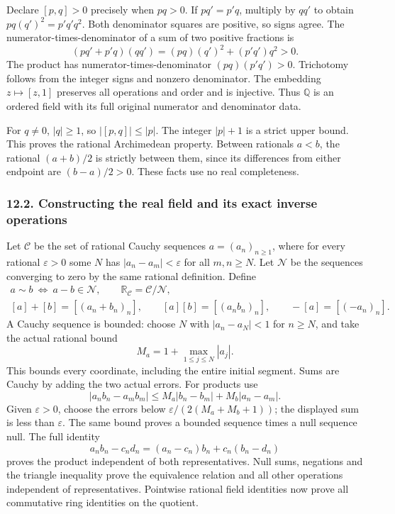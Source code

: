 \documentclass[
  11pt,
]{article}
\begin{document}
Declare \([p,q]>0\) precisely when \(pq>0\). If \(pq'=p'q\), multiply by
\(qq'\) to obtain \(pq(q')^2=p'q'q^2\). Both denominator squares are
positive, so signs agree. The numerator-times-denominator of a sum of
two positive fractions is \[
(pq'+p'q)(qq')=(pq)(q')^2+(p'q')q^2>0.
\tag{RT5}
\] The product has numerator-times-denominator \((pq)(p'q')>0\).
Trichotomy follows from the integer signs and nonzero denominator. The
embedding \(z\mapsto[z,1]\) preserves all operations and order and is
injective. Thus \(\mathbb Q\) is an ordered field with its full original
numerator and denominator data.

For \(q\ne0\), \(|q|\ge1\), so \(|[p,q]|\le |p|\). The integer \(|p|+1\)
is a strict upper bound. This proves the rational Archimedean property.
Between rationals \(a<b\), the rational \((a+b)/2\) is strictly between
them, since its differences from either endpoint are \((b-a)/2>0\).
These facts use no real completeness.

\subsubsection{12.2. Constructing the real field and its exact inverse
operations}\label{constructing-the-real-field-and-its-exact-inverse-operations}

Let \(\mathcal C\) be the set of rational Cauchy sequences
\(a=(a_n)_{n\ge1}\), where for every rational \(\varepsilon>0\) some
\(N\) has \(|a_n-a_m|<\varepsilon\) for all \(m,n\ge N\). Let
\(\mathcal N\) be the sequences converging to zero by the same rational
definition. Define \[
\begin{gathered}
a\sim b\ \Longleftrightarrow\ a-b\in\mathcal N,\qquad
\mathbb R_{\mathcal C}=\mathcal C/\mathcal N,\\
[a]+[b]=[(a_n+b_n)_n],\qquad
[a][b]=[(a_nb_n)_n],\qquad -[a]=[(-a_n)_n].
\end{gathered}
\tag{RT6}
\] A Cauchy sequence is bounded: choose \(N\) with \(|a_n-a_N|<1\) for
\(n\ge N\), and take the actual rational bound \[
M_a=1+\max_{1\le j\le N}|a_j|.
\tag{RT7}
\] This bounds every coordinate, including the entire initial segment.
Sums are Cauchy by adding the two actual errors. For products use \[
|a_nb_n-a_mb_m|
\le M_a|b_n-b_m|+M_b|a_n-a_m|.
\tag{RT8}
\] Given \(\varepsilon>0\), choose the errors below
\(\varepsilon/(2(M_a+M_b+1))\); the displayed sum is less than
\(\varepsilon\). The same bound proves a bounded sequence times a null
sequence null. The full identity \[
a_nb_n-c_nd_n=(a_n-c_n)b_n+c_n(b_n-d_n)
\tag{RT9}
\] proves the product independent of both representatives. Null sums,
negations and the triangle inequality prove the equivalence relation and
all other operations independent of representatives. Pointwise rational
field identities now prove all commutative ring identities on the
quotient.
\end{document}
